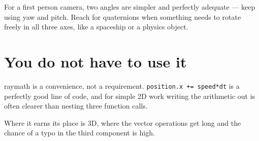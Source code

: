 For a first person camera, two angles are simpler and perfectly adequate --- keep
using yaw and pitch. Reach for quaternions when something needs to rotate freely
in all three axes, like a spaceship or a physics object.

\section{You do not have to use it}

raymath is a convenience, not a requirement. \lstinline|position.x += speed*dt|
is a perfectly good line of code, and for simple 2D work writing the arithmetic
out is often clearer than nesting three function calls.

Where it earns its place is 3D, where the vector operations get long and the
chance of a typo in the third component is high.

